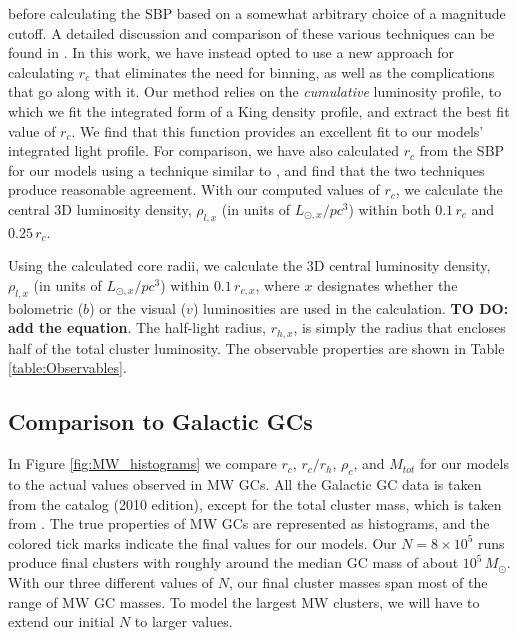 \documentclass[12pt,preprint]{aastex}
\begin{document}
before calculating the SBP \citep{Noyola2006} based on a somewhat arbitrary choice of a magnitude cutoff. A detailed discussion and comparison of these various techniques can be found in \cite{Noyola2006}. In this work, we have instead opted to use a new approach for calculating $r_c$ that eliminates the need for binning, as well as the complications that go along with it. Our method relies on the \emph{cumulative} luminosity profile, to which we fit the integrated form of a King density profile, and extract the best fit value of $r_c$. We find that this function provides an excellent fit to our models' integrated light profile. For comparison, we have also calculated $r_c$ from the SBP  for our models using a technique similar to \cite{Noyola2006}, and find that the two techniques produce reasonable agreement. 
With our computed values of $r_c$, we calculate the central 3D luminosity density, $\rho_{l,x}$ (in units of $L_{\odot,x}/pc^3$) 
within both $0.1\, r_c$ and $0.25\, r_c$.


Using the calculated core radii, we calculate the 3D central luminosity density, $\rho_{l,x}$ (in units of $L_{\odot,x}/pc^3$) within $0.1\,r_{c,x}$, where $x$ designates whether the bolometric ($b$) or the visual ($v$) luminosities are used in the calculation.
\textbf{TO DO: add the equation}. The half-light radius, $r_{h,x}$, is simply the radius that encloses half of the total cluster luminosity. The observable properties are shown in Table \ref{table:Observables}.


\subsection{Comparison to Galactic GCs}


In Figure \ref{fig:MW_histograms} we compare $r_c$, $r_c / r_h$, $\rho_c$, and $M_{tot}$ 
for our models to the actual values observed in MW GCs. All the Galactic GC data is taken
from the \cite{Harris1996} catalog (2010 edition), except for the total 
cluster mass, which is taken from \cite{Gnedin1997}. The true properties of MW 
GCs are represented as histograms, and the colored tick marks indicate the final values for our 
models. Our $N=8 \times 10^5$ runs produce final clusters with roughly around the median GC mass of about $10^5\, M_\odot$. With our three different values of $N$, our final cluster masses span most of the range of
MW GC masses. To model the largest MW clusters, we will have to extend our initial $N$ to larger values.
\end{document}
